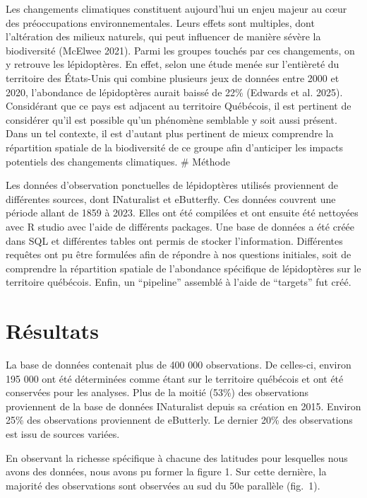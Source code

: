 \documentclass[conference,final,]{IEEEtran}
\begin{document}
Les changements climatiques constituent aujourd'hui un enjeu majeur au
cœur des préoccupations environnementales. Leurs effets sont multiples,
dont l'altération des milieux naturels, qui peut influencer de manière
sévère la biodiversité (McElwee 2021). Parmi les groupes touchés par ces
changements, on y retrouve les lépidoptères. En effet, selon une étude
menée sur l'entièreté du territoire des États-Unis qui combine plusieurs
jeux de données entre 2000 et 2020, l'abondance de lépidoptères aurait
baissé de 22\% (Edwards et al. 2025). Considérant que ce pays est
adjacent au territoire Québécois, il est pertinent de considérer qu'il
est possible qu'un phénomène semblable y soit aussi présent. Dans un tel
contexte, il est d'autant plus pertinent de mieux comprendre la
répartition spatiale de la biodiversité de ce groupe afin d'anticiper
les impacts potentiels des changements climatiques. \# Méthode

Les données d'observation ponctuelles de lépidoptères utilisés
proviennent de différentes sources, dont INaturalist et eButterfly. Ces
données couvrent une période allant de 1859 à 2023. Elles ont été
compilées et ont ensuite été nettoyées avec R studio avec l'aide de
différents packages. Une base de données a été créée dans SQL et
différentes tables ont permis de stocker l'information. Différentes
requêtes ont pu être formulées afin de répondre à nos questions
initiales, soit de comprendre la répartition spatiale de l'abondance
spécifique de lépidoptères sur le territoire québécois. Enfin, un
``pipeline'' assemblé à l'aide de ``targets'' fut créé.

\section{Résultats}\label{ruxe9sultats}

La base de données contenait plus de 400 000 observations. De celles-ci,
environ 195 000 ont été déterminées comme étant sur le territoire
québécois et ont été conservées pour les analyses. Plus de la moitié
(53\%) des observations proviennent de la base de données INaturalist
depuis sa création en 2015. Environ 25\% des observations proviennent de
eButterly. Le dernier 20\% des observations est issu de sources variées.

En observant la richesse spécifique à chacune des latitudes pour
lesquelles nous avons des données, nous avons pu former la figure 1. Sur
cette dernière, la majorité des observations sont observées au sud du
50e parallèle (fig.~1).
\end{document}
